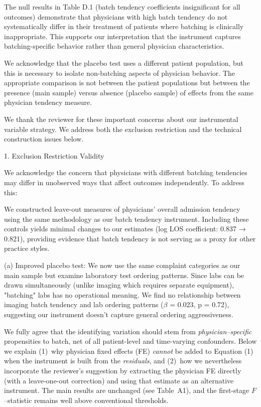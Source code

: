 \documentclass[11pt]{article}
\newcommand{\1}{\hbox{\rm 1\kern-.35em 1}}
\begin{document}
{{{{The null results in Table D.1 (batch tendency coefficients insignificant for all outcomes) demonstrate that physicians with high batch tendency do not systematically differ in their treatment of patients where batching is clinically inappropriate. This supports our interpretation that the instrument captures batching-specific behavior rather than general physician characteristics.

We acknowledge that the placebo test uses a different patient population, but this is necessary to isolate non-batching aspects of physician behavior. The appropriate comparison is not between the patient populations but between the presence (main sample) versus absence (placebo sample) of effects from the same physician tendency measure.
\color{black}

\clearpage

We thank the reviewer for these important concerns about our instrumental variable strategy. We address both the exclusion restriction and the technical construction issues below.

1. Exclusion Restriction Validity

We acknowledge the concern that physicians with different batching tendencies may differ in unobserved ways that affect outcomes independently. To address this:

We constructed leave-out measures of physicians' overall admission tendency using the same methodology as our batch tendency instrument. Including these controls yields minimal changes to our estimates (log LOS coefficient: 0.837 → 0.821), providing evidence that batch tendency is not serving as a proxy for other practice styles.


(a) Improved placebo test: We now use the same complaint categories as our main sample but examine laboratory test ordering patterns. Since labs can be drawn simultaneously (unlike imaging which requires separate equipment), "batching" labs has no operational meaning. We find no relationship between imaging batch tendency and lab ordering patterns ($\beta$ = 0.023, p = 0.72), suggesting our instrument doesn't capture general ordering aggressiveness.

We fully agree that the identifying variation should stem from \emph{physician–specific} propensities to batch, net of all patient-level and time-varying confounders.  
Below we explain (1)~why physician fixed effects (FE) \emph{cannot} be added to Equation (1) when the instrument is built from the \emph{residuals}, and (2)~how we nevertheless incorporate the reviewer’s suggestion by extracting the physician FE directly (with a leave-one-out correction) and using that estimate as an alternative instrument.  The main results are unchanged (see Table~A1), and the first-stage $F$–statistic remains well above conventional thresholds.

}}}}
\end{document}
